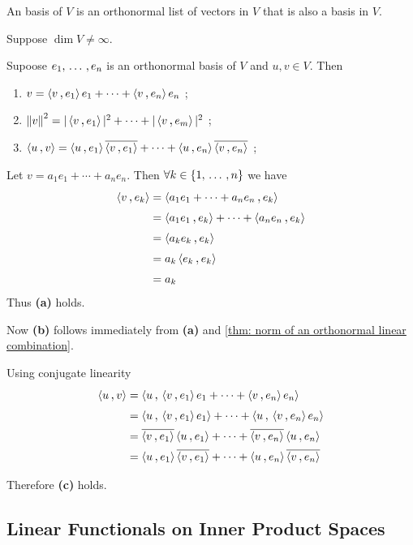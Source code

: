 \begin{mydef}
  An  basis of $V$ is an orthonormal list of vectors in $V$ that is also a basis in $V$.
\end{mydef}

\begin{mydef}
  Suppose $\dim V \neq \infty$.
\end{mydef}

\begin{thm}
  \label{thm: writing a vector as a linear combination of an orthonormal basis}

  Supoose $e_1, {\, \ldots \,\,}, e_n$ is an orthonormal basis of $V$ and $u,v \in V$. Then
  \begin{enumerate}[label=\textbf{(\alph*)}]
    \item $v=\ip{v}{e_1}e_1 + \cdots + \ip{v}{e_n}e_n$ ;
    \item $\norm{v}^2 = |\ip{v}{e_1}|^2 + \cdots + |\ip{v}{e_m}|^2$ ;
    \item $\ip{u}{v} = \ip{u}{e_1} \overline{\ip{v}{e_1}} + \cdots + \ip{u}{e_n} \overline{\ip{v}{e_n}}$ ;
  \end{enumerate}
\end{thm}
\begin{prf}
  Let $v=a_1 e_1 + \cdots + a_n e_n$. Then $\forall k \in \{1, {\, \ldots \,\,}, n\}$ we have
  \begin{equation}
    \begin{aligned}
      \ip{v}{e_k}
      &=\ip{a_1 e_1 + \cdots + a_n e_n}{e_k} \\
      &=\ip{a_1 e_1}{e_k} + \cdots + \ip{a_n e_n}{e_k}\\
      &=\ip{a_ke_k}{e_k} \\
      &= a_k\ip{e_k}{e_k} \\
      &=a_k
    \end{aligned}
  \end{equation}
  Thus \textbf{(a)} holds.

  Now \textbf{(b)} follows immediately from \textbf{(a)} and \ref{thm: norm of an orthonormal linear combination}.

  Using conjugate linearity
  \begin{equation}
    \begin{aligned}
      \ip{u}{v}
      &=\ip{u}{\ip{v}{e_1}e_1 + \cdots + \ip{v}{e_n}e_n} \\
      &= \ip{u}{\ip{v}{e_1}e_1} + \cdots + \ip{u}{\ip{v}{e_n}e_n} \\
      &= \overline{\ip{v}{e_1}}\ip{u}{e_1} + \cdots + \overline{\ip{v}{e_n}}\ip{u}{e_n} \\
      &= \ip{u}{e_1}\overline{\ip{v}{e_1}} + \cdots + \ip{u}{e_n}\overline{\ip{v}{e_n}}
    \end{aligned}
  \end{equation}

  Therefore \textbf{(c)} holds.
\end{prf}

\subsection{Linear Functionals on Inner Product Spaces}